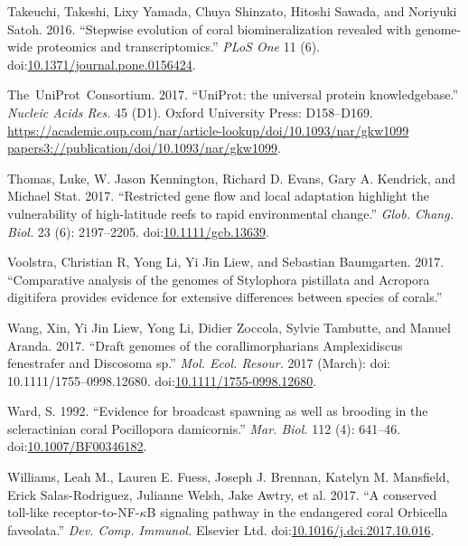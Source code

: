 \documentclass[]{elsarticle} %
\begin{document}
\hypertarget{ref-Takeuchi2016}{}
Takeuchi, Takeshi, Lixy Yamada, Chuya Shinzato, Hitoshi Sawada, and
Noriyuki Satoh. 2016. ``Stepwise evolution of coral biomineralization
revealed with genome-wide proteomics and transcriptomics.'' \emph{PLoS
One} 11 (6).
doi:\href{https://doi.org/10.1371/journal.pone.0156424}{10.1371/journal.pone.0156424}.

\hypertarget{ref-TheUniProtConsortium2017}{}
The~UniProt~Consortium. 2017. ``UniProt: the universal protein
knowledgebase.'' \emph{Nucleic Acids Res.} 45 (D1). Oxford University
Press: D158--D169.
\href{https://academic.oup.com/nar/article-lookup/doi/10.1093/nar/gkw1099\%20papers3://publication/doi/10.1093/nar/gkw1099}{https://academic.oup.com/nar/article-lookup/doi/10.1093/nar/gkw1099 papers3://publication/doi/10.1093/nar/gkw1099}.

\hypertarget{ref-Thomas2017}{}
Thomas, Luke, W. Jason Kennington, Richard D. Evans, Gary A. Kendrick,
and Michael Stat. 2017. ``Restricted gene flow and local adaptation
highlight the vulnerability of high-latitude reefs to rapid
environmental change.'' \emph{Glob. Chang. Biol.} 23 (6): 2197--2205.
doi:\href{https://doi.org/10.1111/gcb.13639}{10.1111/gcb.13639}.

\hypertarget{ref-Voolstra2017}{}
Voolstra, Christian R, Yong Li, Yi Jin Liew, and Sebastian Baumgarten.
2017. ``Comparative analysis of the genomes of Stylophora pistillata and
Acropora digitifera provides evidence for extensive differences between
species of corals.''

\hypertarget{ref-Wang2017a}{}
Wang, Xin, Yi Jin Liew, Yong Li, Didier Zoccola, Sylvie Tambutte, and
Manuel Aranda. 2017. ``Draft genomes of the corallimorpharians
Amplexidiscus fenestrafer and Discosoma sp.'' \emph{Mol. Ecol. Resour.}
2017 (March): doi: 10.1111/1755--0998.12680.
doi:\href{https://doi.org/10.1111/1755-0998.12680}{10.1111/1755-0998.12680}.

\hypertarget{ref-Ward1992}{}
Ward, S. 1992. ``Evidence for broadcast spawning as well as brooding in
the scleractinian coral Pocillopora damicornis.'' \emph{Mar. Biol.} 112
(4): 641--46.
doi:\href{https://doi.org/10.1007/BF00346182}{10.1007/BF00346182}.

\hypertarget{ref-Williams2017}{}
Williams, Leah M., Lauren E. Fuess, Joseph J. Brennan, Katelyn M.
Mansfield, Erick Salas-Rodriguez, Julianne Welsh, Jake Awtry, et al.
2017. ``A conserved toll-like receptor-to-NF-\(\kappa\)B signaling
pathway in the endangered coral Orbicella faveolata.'' \emph{Dev. Comp.
Immunol.} Elsevier Ltd.
doi:\href{https://doi.org/10.1016/j.dci.2017.10.016}{10.1016/j.dci.2017.10.016}.
\end{document}
